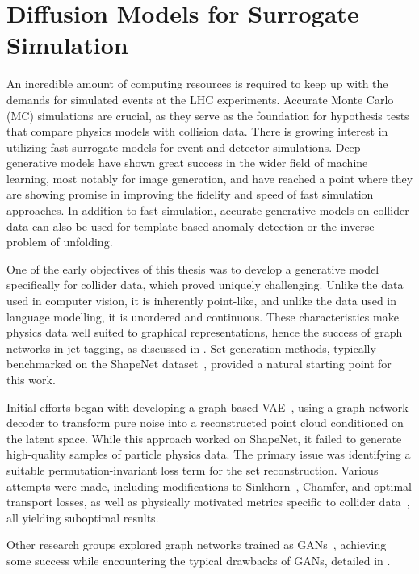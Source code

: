 \chapter{Diffusion Models for Surrogate Simulation}

An incredible amount of computing resources is required to keep up with the demands for simulated events at the LHC experiments.
Accurate Monte Carlo (MC) simulations are crucial, as they serve as the foundation for hypothesis tests that compare physics models with collision data.
There is growing interest in utilizing fast surrogate models for event and detector simulations.
Deep generative models have shown great success in the wider field of machine learning, most notably for image generation, and have reached a point where they are showing promise in improving the fidelity and speed of fast simulation approaches.
In addition to fast simulation, accurate generative models on collider data can also be used for template-based anomaly detection or the inverse problem of unfolding.

One of the early objectives of this thesis was to develop a generative model specifically for collider data, which proved uniquely challenging.
Unlike the data used in computer vision, it is inherently point-like, and unlike the data used in language modelling, it is unordered and continuous.
These characteristics make physics data well suited to graphical representations, hence the success of graph networks in jet tagging, as discussed in .
Set generation methods, typically benchmarked on the ShapeNet dataset~\cite{ShapeNet}, provided a natural starting point for this work.

Initial efforts began with developing a graph-based VAE~\cite{SetVAE}, using a graph network decoder to transform pure noise into a reconstructed point cloud conditioned on the latent space.
While this approach worked on ShapeNet, it failed to generate high-quality samples of particle physics data.
The primary issue was identifying a suitable permutation-invariant loss term for the set reconstruction.
Various attempts were made, including modifications to Sinkhorn~\cite{Sinkhorn}, Chamfer, and optimal transport losses, as well as physically motivated metrics specific to collider data~\cite{MetricSpaceCollider}, all yielding suboptimal results.

Other research groups explored graph networks trained as GANs~\cite{MPGAN, EPICGAN}, achieving some success while encountering the typical drawbacks of GANs, detailed in .

